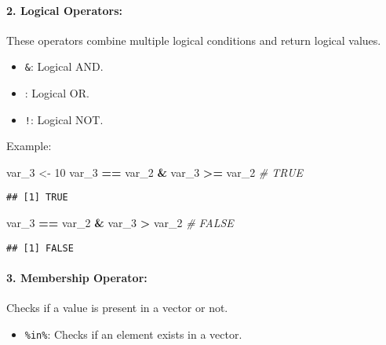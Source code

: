 \documentclass[
]{article}
\newenvironment{Shaded}{\begin{snugshade}}{\end{snugshade}}
\newcommand{\CommentTok}[1]{\textcolor[rgb]{0.56,0.35,0.01}{\textit{#1}}}
\newcommand{\DecValTok}[1]{\textcolor[rgb]{0.00,0.00,0.81}{#1}}
\newcommand{\NormalTok}[1]{#1}
\newcommand{\OtherTok}[1]{\textcolor[rgb]{0.56,0.35,0.01}{#1}}
\newcommand{\SpecialCharTok}[1]{\textcolor[rgb]{0.81,0.36,0.00}{\textbf{#1}}}
\providecommand{\tightlist}{%
  \setlength{\itemsep}{0pt}\setlength{\parskip}{0pt}}
\begin{document}
\paragraph{\texorpdfstring{2. \textbf{Logical
Operators}:}{2. Logical Operators:}}\label{logical-operators}

These operators combine multiple logical conditions and return logical
values.

\begin{itemize}
\tightlist
\item
  \texttt{\&}: Logical AND.
\item
  \texttt{\textbar{}}: Logical OR.
\item
  \texttt{!}: Logical NOT.
\end{itemize}

Example:

\begin{Shaded}
\begin{Highlighting}[]
\NormalTok{var\_3 }\OtherTok{\textless{}{-}} \DecValTok{10}
\NormalTok{var\_3 }\SpecialCharTok{==}\NormalTok{ var\_2 }\SpecialCharTok{\&}\NormalTok{ var\_3 }\SpecialCharTok{\textgreater{}=}\NormalTok{ var\_2  }\CommentTok{\# TRUE}
\end{Highlighting}
\end{Shaded}

\begin{verbatim}
## [1] TRUE
\end{verbatim}

\begin{Shaded}
\begin{Highlighting}[]
\NormalTok{var\_3 }\SpecialCharTok{==}\NormalTok{ var\_2 }\SpecialCharTok{\&}\NormalTok{ var\_3 }\SpecialCharTok{\textgreater{}}\NormalTok{ var\_2   }\CommentTok{\# FALSE}
\end{Highlighting}
\end{Shaded}

\begin{verbatim}
## [1] FALSE
\end{verbatim}

\paragraph{\texorpdfstring{3. \textbf{Membership
Operator}:}{3. Membership Operator:}}\label{membership-operator}

Checks if a value is present in a vector or not.

\begin{itemize}
\tightlist
\item
  \texttt{\%in\%}: Checks if an element exists in a vector.
\end{itemize}
\end{document}
